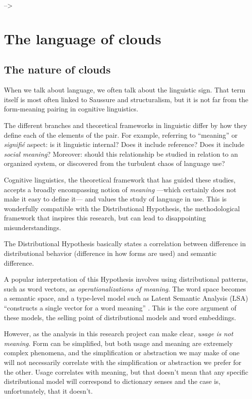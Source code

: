 \documentclass[
]{book}
\begin{document}
--\textgreater{}

\hypertarget{part-the-language-of-clouds}{%
\part{The language of clouds}\label{part-the-language-of-clouds}}

\hypertarget{the-nature-of-clouds}{%
\chapter{The nature of clouds}\label{the-nature-of-clouds}}

When we talk about language, we often talk about the linguistic sign. That term itself
is most often linked to Saussure
and structuralism, but it is not far from the form-meaning pairing in cognitive linguistics.

The different branches and theoretical frameworks in linguistic differ by how they
define each of the elements of the pair. For example, referring to ``meaning'' or \emph{signifié}
aspect: is it linguistic internal? Does it include reference? Does it include \emph{social meaning}?
Moreover: should this relationship be studied in relation to an organized system,
or discovered from the turbulent chaos of language use?

Cognitive linguistics, the theoretical framework that has guided these studies, accepts
a broadly encompassing notion of \emph{meaning} ---which certainly does not make it easy to
define it--- and values the study of language in use. This is wonderfully compatible with
the Distributional Hypothesis, the methodological framework that inspires this research,
but can lead to disappointing misunderstandings.

The Distributional Hypothesis basically states a correlation between difference in
distributional behavior (difference in how forms are used) and semantic difference.

A popular interpretation of this Hypothesis involves using distributional patterns,
such as word vectors, as \emph{operationalizations of meaning}. The word space becomes a
semantic space, and a type-level model such as Latent Semantic Analysis (LSA)
``constructs a single vector for a word meaning'' \autocite[ 82]{bolognesi_2020}. This is the core
argument of these models, the selling point of distributional models and word embeddings.

However, as the analysis in this research project can make clear, \emph{usage is not meaning}.
Form can be simplified, but both usage and meaning are extremely complex phenomena,
and the simplification or abstraction we may make of one will not necessarily correlate
with the simplification or abstraction we prefer for the other. Usage correlates with
meaning, but that doesn't mean that any specific distributional model will correspond
to dictionary senses and the case is, unfortunately, that it doesn't.
\end{document}
